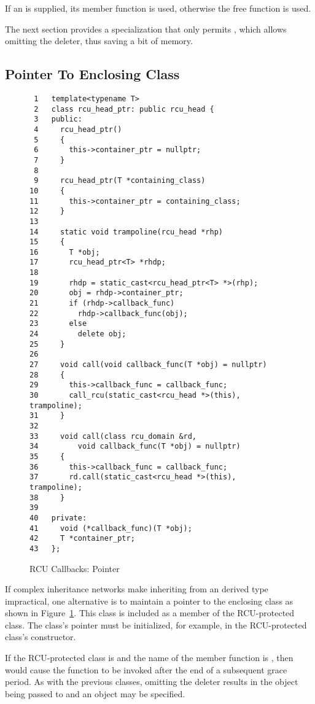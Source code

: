 \documentclass[letterpaper,10pt]{article}
\begin{document}
If an  is supplied, its 
member function is used, otherwise the  free
function is used.

The next section provides a specialization that only permits ,
which allows omitting the deleter, thus saving a bit of memory.

\subsection{Pointer To Enclosing Class}
\label{sec:Pointer To Enclosing Class}

\begin{figure}[tbp]
{ \scriptsize
\begin{verbatim}
 1   template<typename T>
 2   class rcu_head_ptr: public rcu_head {
 3   public:
 4     rcu_head_ptr()
 5     {
 6       this->container_ptr = nullptr;
 7     }
 8
 9     rcu_head_ptr(T *containing_class)
10     {
11       this->container_ptr = containing_class;
12     }
13
14     static void trampoline(rcu_head *rhp)
15     {
16       T *obj;
17       rcu_head_ptr<T> *rhdp;
18
19       rhdp = static_cast<rcu_head_ptr<T> *>(rhp);
20       obj = rhdp->container_ptr;
21       if (rhdp->callback_func)
22         rhdp->callback_func(obj);
23       else
24         delete obj;
25     }
26
27     void call(void callback_func(T *obj) = nullptr)
28     {
29       this->callback_func = callback_func;
30       call_rcu(static_cast<rcu_head *>(this), trampoline);
31     }
32
33     void call(class rcu_domain &rd,
34         void callback_func(T *obj) = nullptr)
35     {
36       this->callback_func = callback_func;
37       rd.call(static_cast<rcu_head *>(this), trampoline);
38     }
39
40   private:
41     void (*callback_func)(T *obj);
42     T *container_ptr;
43   };
\end{verbatim}
}
\caption{RCU Callbacks: Pointer}
\label{fig:RCU Callbacks: Pointer}
\end{figure}

If complex inheritance networks make inheriting from an
 derived type impractical, one alternative is
to maintain a pointer to the enclosing class as shown in
Figure~\ref{fig:RCU Callbacks: Pointer}.
This  class is included as a member of the RCU-protected
class.
The  class's pointer must be initialized, for example,
in the RCU-protected class's constructor.

If the RCU-protected class is  and the name of the
 member function is , then
 would cause the function  to be
invoked after the end of a subsequent grace period.
As with the previous classes, omitting the deleter results
in the object being passed to  and an 
object may be specified.
\end{document}
